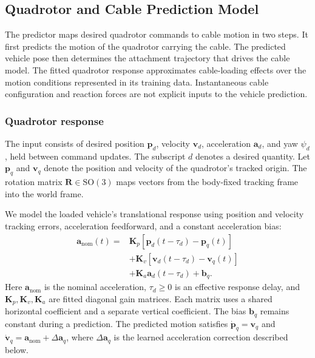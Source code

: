 \documentclass[letterpaper, 10 pt, conference]{ieeeconf}
\begin{document}
\subsection{Quadrotor and Cable Prediction Model}
\label{subsec:prediction_model}

The predictor maps desired quadrotor commands to cable motion
in two steps. It first predicts the motion of the quadrotor
carrying the cable. The predicted vehicle pose then determines
the attachment trajectory that drives the cable model.
The fitted quadrotor response approximates cable-loading
effects over the motion conditions represented in its training
data. Instantaneous cable configuration and reaction forces
are not explicit inputs to the vehicle prediction.

\subsubsection{Quadrotor response}
The input consists of desired position $\mathbf{p}_d$, velocity
$\mathbf{v}_d$, acceleration $\mathbf{a}_d$, and yaw $\psi_d$,
held between command updates. The subscript $d$ denotes a desired
quantity. Let $\mathbf{p}_q$ and $\mathbf{v}_q$ denote the
position and velocity of the quadrotor's tracked origin.
The rotation matrix $\mathbf{R}\in \mathrm{SO}(3)$ maps vectors from the
body-fixed tracking frame into the world frame.

We model the loaded vehicle's translational response using
position and velocity tracking errors, acceleration feedforward,
and a constant acceleration bias:
\begin{equation}
\begin{aligned}
\mathbf{a}_{\mathrm{nom}}(t)
={}&\mathbf{K}_p[\mathbf{p}_d(t-\tau_d)-\mathbf{p}_q(t)]\\
&+\mathbf{K}_v[\mathbf{v}_d(t-\tau_d)-\mathbf{v}_q(t)]\\
&+\mathbf{K}_a\mathbf{a}_d(t-\tau_d)+\mathbf{b}_q.
\end{aligned}
\label{eq:quadrotor_response}
\end{equation}
Here $\mathbf{a}_{\mathrm{nom}}$ is the nominal acceleration,
$\tau_d\geq0$ is an effective response delay, and
$\mathbf{K}_p,\mathbf{K}_v,\mathbf{K}_a$ are fitted diagonal gain matrices.
Each matrix uses a shared horizontal coefficient and a separate
vertical coefficient. The bias $\mathbf{b}_q$ remains constant
during a prediction. The predicted motion satisfies
$\dot{\mathbf{p}}_q=\mathbf{v}_q$ and
$\dot{\mathbf{v}}_q=\mathbf{a}_{\mathrm{nom}}
+\Delta\mathbf{a}_q$, where $\Delta\mathbf{a}_q$ is the learned
acceleration correction described below.
\end{document}

